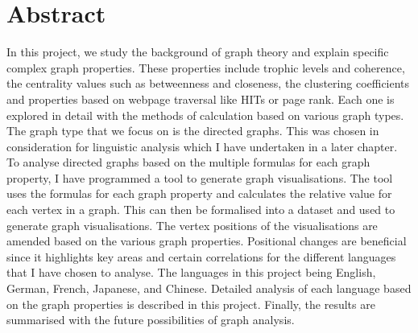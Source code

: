 \chapter*{Abstract}
In this project, we study the background of graph theory and explain specific complex graph properties. These properties include trophic levels and coherence, the centrality values such as betweenness and closeness, the clustering coefficients and properties based on webpage traversal like HITs or page rank. Each one is explored in detail with the methods of calculation based on various graph types. The graph type that we focus on is the directed graphs. This was chosen in consideration for linguistic analysis which I have undertaken in a later chapter. To analyse directed graphs based on the multiple formulas for each graph property, I have programmed a tool to generate graph visualisations. The tool uses the formulas for each graph property and calculates the relative value for each vertex in a graph. This can then be formalised into a dataset and used to generate graph visualisations. The vertex positions of the visualisations are amended based on the various graph properties. Positional changes are beneficial since it highlights key areas and certain correlations for the different languages that I have chosen to analyse. The languages in this project being English, German, French, Japanese, and Chinese. Detailed analysis of each language based on the graph properties is described in this project. Finally, the results are summarised with the future possibilities of graph analysis.